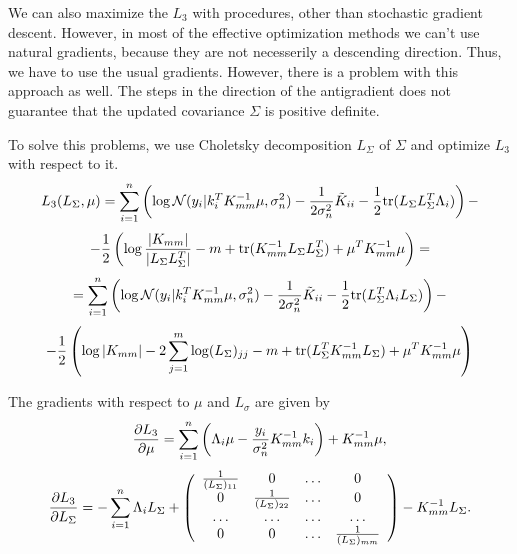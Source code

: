 We can also maximize the $L_3$ with procedures, other than stochastic gradient descent. However, in most of the effective optimization methods we can't use natural gradients, because they are not necesserily a descending direction. Thus, we have to use the usual gradients. However, there is a problem with this approach as well. The steps in the direction of the antigradient does not guarantee that the updated covariance $\Sigma$ is positive definite. 

To solve this problems, we use Choletsky decomposition $L_{\Sigma}$ of $\Sigma$ and optimize $L_3$ with respect to it.
$$L_3(L_{\Sigma}, \mu) = \sum_{i = 1}^{n} \left( \log \mathcal{N}(y_i | k_i^T K_{mm}^{-1} \mu, \sigma_n^2) - \frac 1 {2 \sigma_n^2} \tilde K_{ii} - \frac 1 2 \mbox{tr} (L_{\Sigma} L_{\Sigma}^T \Lambda_i) \right) - $$
$$ -\frac 1 2 \left (\log \frac {|K_{mm}|} {|L_{\Sigma} L_{\Sigma}^T|} - m + \mbox{tr}(K_{mm}^{-1} L_{\Sigma} L_{\Sigma}^T) + \mu^T K_{mm}^{-1} \mu \right) = $$
$$ = \sum_{i = 1}^{n} \left( \log \mathcal{N}(y_i | k_i^T K_{mm}^{-1} \mu, \sigma_n^2) - \frac 1 {2 \sigma_n^2} \tilde K_{ii} - \frac 1 2 \mbox{tr} (L_{\Sigma}^T \Lambda_iL_{\Sigma}) \right) - $$
$$ -\frac 1 2 \left (\log |K_{mm}| - 2 \sum_{j=1}^{m}\log (L_{\Sigma})_{jj} - m + \mbox{tr}(L_{\Sigma}^T K_{mm}^{-1} L_{\Sigma}) + \mu^T K_{mm}^{-1} \mu \right)$$

The gradients with respect to $\mu$ and $L_{\sigma}$ are given by
$$
\frac{\partial L_3}{\partial \mu} =  \sum_{i=1}^n \left(\Lambda_i \mu - \frac {y_i}{\sigma_n^2} K_{mm}^{-1} k_i \right) + K_{mm}^{-1} \mu,
$$
$$\frac{\partial L_3}{\partial L_{\Sigma}} = - \sum_{i=1}^n \Lambda_i L_{\Sigma} +
\left(
\begin{array}{cccc}
\frac 1 {(L_{\Sigma})_{11}} & 0 & \ldots & 0\\
0 & \frac 1 {(L_{\Sigma})_{22}} & \ldots & 0\\
\ldots & \ldots & \ldots & \ldots\\
0 & 0 & \ldots & \frac 1 {(L_{\Sigma})_{mm}} \\
\end{array}   
\right) 
- K_{mm}^{-1} L_{\Sigma}.
$$